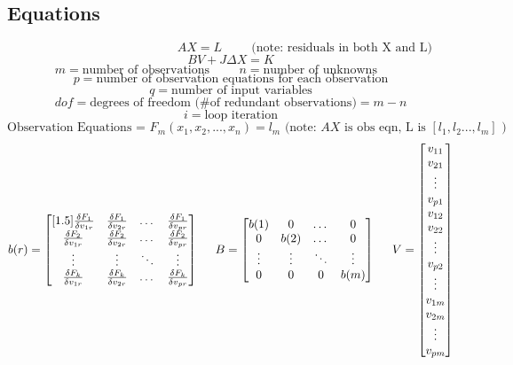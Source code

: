 \subsection{Equations}
\[
\hspace{5cm} AX=L \hspace{1cm} \text{(note: residuals in both X and L)}
\]
\[
BV + J\Delta X = K 
\]
\[
m = \text{number of observations} \hspace{1cm} 
n = \text{number of unknowns} \hspace{1cm}
\]
\[
p = \text{number of observation equations for each observation}
\]
\[
q = \text{number of input variables}
\]
\[
dof = \text{degrees of freedom (\# of redundant observations)} = m-n
\]
\[
i = \text{loop iteration}
\]
\[
\text{Observation Equations =  } F_m(x_1,x_2,...,x_n) = l_m \text{ (note: }AX\text{ is obs eqn, L is }[l_1,l_2...,l_m] \text{ )}
\]
\setcounter{MaxMatrixCols}{20}
\[
b(r) = 
\begin{bmatrix}[1.5]
\frac{\delta F_1}{\delta v_{1r}} & \frac{\delta F_1}{\delta v_{2r}} & \dots & \frac{\delta F_1}{\delta v_{pr}} \\
\frac{\delta F_2}{\delta v_{1r}} & \frac{\delta F_2}{\delta v_{2r}} & \dots & \frac{\delta F_2}{\delta v_{pr}} \\
\vdots & \vdots & \ddots & \vdots \\
\frac{\delta F_k}{\delta v_{1r}} & \frac{\delta F_k}{\delta v_{2r}} & \dots & \frac{\delta F_k}{\delta v_{pr}} \\

\end{bmatrix}
\hspace{0.5cm}
B = 
\begin{bmatrix}
b(1) & 0 & \dots & 0 \\
0 & b(2) & \dots & 0 \\
\vdots & \vdots & \ddots & \vdots \\
0 & 0 & 0 & b(m) \\
\end{bmatrix}
\hspace{0.5cm}
V = 
\begin{bmatrix}
v_{11} \\
v_{21} \\
\vdots \\
v_{p1} \\
v_{12} \\
v_{22} \\
\vdots \\
v_{p2} \\
\vdots \\
v_{1m} \\
v_{2m} \\
\vdots \\
v_{pm}
\end{bmatrix}
\]
